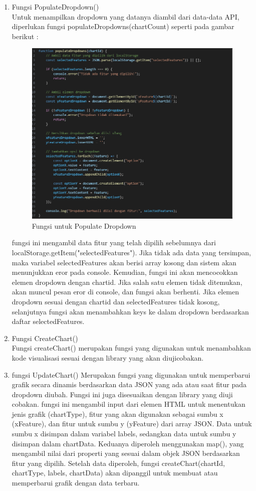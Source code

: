 \begin{enumerate}[label={\alph*.}]
	\item Fungsi PopulateDropdown()\\
	Untuk menampilkan dropdown yang datanya diambil dari data-data API, diperlukan fungsi populateDropdowns(chartCount) seperti pada gambar berikut : 
		\begin{figure}[H]
		\centering
		\includegraphics[width=0.8\linewidth]{gambar/Pembahasan/fungsi_populate_dropdown.png}
		\caption{Fungsi untuk Populate Dropdown}
		\label{Fungsi untuk Populate Dropdown}
	\end{figure}
	fungsi ini mengambil data fitur yang telah dipilih sebelumnya dari localStorage.getItem("selectedFeatures"). Jika tidak ada data yang tersimpan, maka variabel selectedFeatures akan berisi array kosong dan sistem akan menunjukkan eror pada console. Kemudian, fungsi ini akan mencocokkan elemen dropdown dengan chartid. Jika salah satu elemen tidak ditemukan, akan muncul pesan eror di console, dan fungsi akan berhenti. Jika elemen dropdown sesuai dengan chartid dan selectedFeatures tidak kosong, selanjutnya fungsi akan menambahkan keys ke dalam dropdown berdasarkan daftar selectedFeatures.
	\item Fungsi CreateChart()\\
	Fungsi createChart() merupakan fungsi yang digunakan untuk menambahkan kode visualisasi sesuai dengan library yang akan diujicobakan.
	\item fungsi UpdateChart()
	 Merupakan fungsi yang digunakan untuk memperbarui grafik secara dinamis berdasarkan data JSON yang ada atau saat fitur pada dropdown diubah. Fungsi ini juga disesuaikan dengan library yang diuji cobakan. 
	fungsi ini mengambil input dari elemen HTML untuk menentukan jenis grafik (chartType), fitur yang akan digunakan sebagai sumbu x (xFeature), dan fitur untuk sumbu y (yFeature) dari array JSON. Data untuk sumbu x disimpan dalam variabel labels, sedangkan data untuk sumbu y disimpan dalam chartData. Keduanya diperoleh menggunakan map(), yang mengambil nilai dari properti yang sesuai dalam objek JSON berdasarkan fitur yang dipilih. Setelah data diperoleh, fungsi createChart(chartId, chartType, labels, chartData) akan dipanggil untuk membuat atau memperbarui grafik dengan data terbaru. 

\end{enumerate}
